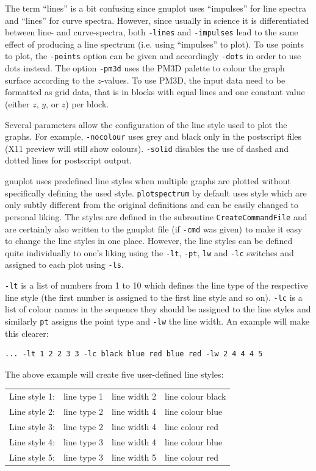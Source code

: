 \documentclass[12pt, a4paper]{article}
\begin{document}
The term ``lines'' is a bit confusing since gnuplot uses ``impulses'' for line spectra and ``lines'' for curve spectra. However, since usually in science it is differentiated between line- and curve-spectra, both \verb'-lines' and \verb'-impulses' lead to the same effect of producing a line spectrum (i.e. using ``impulses'' to plot). To use points to plot, the \verb'-points' option can be given and accordingly \verb'-dots' in order to use dots instead. The option \verb'-pm3d' uses the PM3D palette to colour the graph surface according to the $z$-values. To use PM3D, the input data need to be formatted as grid data, that is in blocks with equal lines and one constant value (either $z$, $y$, or $z$) per block.

Several parameters allow the configuration of the line style used to plot the graphs. For example, \verb'-nocolour' uses grey and black only in the postscript files (X11 preview will still show colours). \verb'-solid' disables the use of dashed and dotted lines for postscript output.

gnuplot uses predefined line styles when multiple graphs are plotted without specifically defining the used style. \verb'plotspectrum' by default uses style which are only subtly different from the original definitions and can be easily changed to personal liking. The styles are defined in the subroutine \verb'CreateCommandFile' and are certainly also written to the gnuplot file (if \verb'-cmd' was given) to make it easy to change the line styles in one place. However, the line styles can be defined quite individually to one's liking using the \verb'-lt', \verb'-pt', \verb'lw' and \verb'-lc' switches and assigned to each plot using \verb'-ls'.

\verb'-lt' is a list of numbers from 1 to 10 which defines the line type of the respective line style (the first number is assigned to the first line style and so on). \verb'-lc' is a list of colour names in the sequence they should be assigned to the line styles and similarly \verb'pt' assigns the point type and \verb'-lw' the line width. An example will make this clearer:

\begin{verbatim}
... -lt 1 2 2 3 3 -lc black blue red blue red -lw 2 4 4 4 5
\end{verbatim}

The above example will create five user-defined line styles:

\begin{tabular}{llll}
Line style 1: & line type 1 & line width 2 & line colour black \\
Line style 2: & line type 2 & line width 4 & line colour blue  \\
Line style 3: & line type 2 & line width 4 & line colour red   \\
Line style 4: & line type 3 & line width 4 & line colour blue  \\
Line style 5: & line type 3 & line width 5 & line colour red   \\
\end{tabular}
\end{document}
